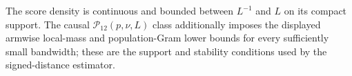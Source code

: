 The score density is continuous and bounded between \(L^{-1}\) and \(L\) on its compact support.  The causal \(\mathcal P_{12}(p,\nu,L)\) class additionally imposes the displayed armwise local-mass and population-Gram lower bounds for every sufficiently small bandwidth; these are the support and stability conditions used by the signed-distance estimator.